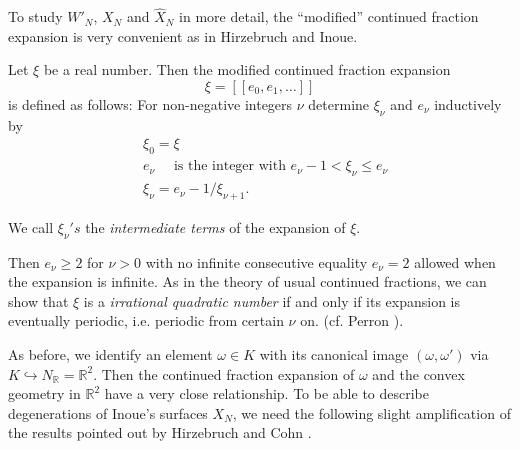 To study $W'_N$, $X_N$ and $\hat{X}_N$ in more detail, the ``modified''
continued fraction expansion is very convenient as in Hirzebruch
\cite{keyH4} and Inoue\cite{keyI3}. 

\begin{defi*}
Let $\xi$ be a real number. Then the modified continued fraction
expansion 
$$
\xi = [[ e_0,e_1 , \ldots]]
$$
is defined as follows:  For non-negative integers $\nu$ determine 
$\xi_{\nu}$ and $e_{\nu}$ inductively by  
\begin{align*}
& \xi_0 = \xi \\
& e_{\nu} \quad \text{ is the integer with } e_{\nu} - 1 < \xi_{\nu}
  \leq e_{\nu} \\ 
& \xi_{\nu}= e_{\nu}- 1/ \xi_{\nu +1}.
\end{align*}\pageoriginale

We call $\xi_{\nu}'s$ the \textit{intermediate terms} of the
expansion of $\xi$. 
\end{defi*}

Then $e_{\nu} \geq 2$ for $\nu > 0$ with no infinite consecutive
equality $e_{\nu}= 2$ allowed when the expansion is infinite.  As in
the theory of usual continued fractions,  we can show that $\xi$ is a
\textit{irrational quadratic number} if and only if its expansion is
eventually periodic, i.e. periodic from certain $\nu$ on. (cf. Perron
\cite{keyP1}). 

As before, we identify an element $\omega \in K$ with its canonical
image $(\omega,\omega')$ via $K \hookrightarrow N_{\mathbb{R}} =
\mathbb{R}^2$. Then the continued fraction expansion of $\omega$ and
the convex geometry in $\mathbb{R}^2$ have a very close
relationship. To be able to describe degenerations of Inoue's surfaces
$X_N$, we need the following slight amplification  of the results
pointed out by Hirzebruch \cite{keyH4} and Cohn \cite{keyC2}. 

